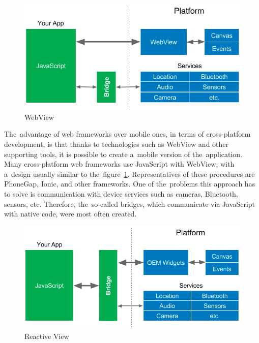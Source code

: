 \begin{figure}
    \centering
    \includegraphics[width=1\linewidth]{assets/design/webview.png}
    \caption{WebView~\cite{leler_2017_whats}}
    \label{fig:design:webview}
\end{figure}

The~advantage of web frameworks over mobile ones, in terms of cross-platform development, is that thanks to technologies such as WebView and other supporting tools, it is possible to create a~mobile version of the~application.
Many cross-platform web frameworks use JavaScript with WebView, with a~design usually similar to the~figure~\ref{fig:design:webview}.
Representatives of these procedures are PhoneGap, Ionic, and other frameworks.
One of the~problems this approach has to solve is communication with device services such as cameras, Bluetooth, sensors, etc.
Therefore, the~so-called bridges, which communicate via JavaScript with native code, were most often created.

\begin{figure}
    \centering
    \includegraphics[width=1\linewidth]{assets/design/reactive.png}
    \caption{Reactive View~\cite{leler_2017_whats}}
    \label{fig:design:reactiveview}
\end{figure}


